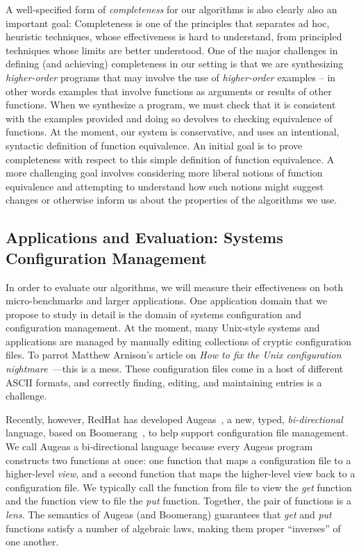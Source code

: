 A well-specified form of \textit{completeness} for our algorithms
is also clearly also an important goal:  Completeness is one of the principles
that separates ad hoc, heuristic techniques, whose effectiveness is hard to 
understand, from principled techniques whose limits are better understood.
One of the major challenges in defining (and achieving)
completeness in our setting is that we are synthesizing \emph{higher-order}
programs that may involve the use of \emph{higher-order} examples -- in
other words examples that involve functions as arguments or results of
other functions.  When we synthesize a program, we must check that it is 
consistent with the examples provided and doing so devolves to checking
equivalence of functions.  At the moment, our system is conservative,
and uses an intentional, syntactic definition of function equivalence.
An initial goal is to prove completeness with respect to this simple
definition of function equivalence.  A more challenging goal involves
considering more liberal notions of function equivalence and attempting
to understand how such notions might suggest changes or otherwise
inform us about the properties of the algorithms we use.

\subsection{Applications and Evaluation:  Systems Configuration Management}
\label{sec:appl}

In order to evaluate our algorithms, we will measure their
effectiveness on both micro-benchmarks and larger 
applications.  
One application domain that we propose to study in detail is the domain
of systems configuration and configuration management.
At the moment, many Unix-style systems and applications are managed 
by manually editing collections of cryptic configuration files.  
To parrot Matthew Arnison's article on
\emph{How to fix the Unix configuration nightmare}~\cite{unix-config-nightmare}---this is a mess.  These configuration files
come in a host of different ASCII formats, and correctly finding,
editing, and maintaining entries is a challenge.  

Recently, however, RedHat has developed Augeas~\cite{augeas}, a new, typed,
\emph{bi-directional} language, based on Boomerang~\cite{Boomerang07,bohannon2008boomerang,foster-thesis}, 
to help support configuration file
management.  We call Augeas a bi-directional language because every
Augeas program constructs two functions at once:  one function that maps
a configuration file to a higher-level \emph{view}, and a second
function that maps the higher-level view back to a configuration file.
We typically call the function from file to view the \emph{get} function
and the function view to file the \emph{put} function.  Together,
the pair of functions is a \emph{lens}.
The semantics of Augeas (and Boomerang) guarantees that 
\emph{get} and \emph{put} functions satisfy a number of 
algebraic laws,
making them proper ``inverses'' of one another.

